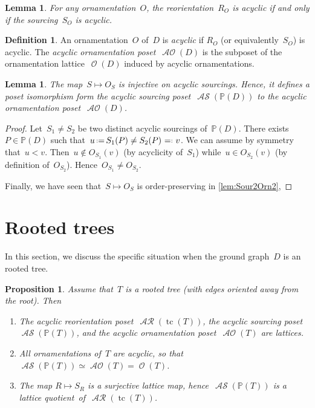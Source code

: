 \documentclass{amsart}
\newtheorem{proposition}[theorem]{Proposition}
\newtheorem{lemma}[theorem]{Lemma}
\theoremstyle{definition}
\newtheorem{definition}[theorem]{Definition}
\renewcommand{\c}[1]{\mathcal{#1}} %
\newcommand{\eqdef}{\mbox{\,\raisebox{0.2ex}{\scriptsize\ensuremath{\mathrm:}}\ensuremath{=}\,}} %
\newcommand{\defeq}{\mbox{~\ensuremath{=}\raisebox{0.2ex}{\scriptsize\ensuremath{\mathrm:}} }} %
\DeclareMathOperator{\tc}{tc} %
\newcommand{\darkblue}{\color{darkblue}} %
\newcommand{\defn}[1]{\textsl{\darkblue #1}} %
\DeclareMathOperator{\Orn}{\c{O}}  %
\DeclareMathOperator{\AOrn}{\c{AO}}  %
\DeclareMathOperator{\AReori}{\c{AR}}  %
\DeclareMathOperator{\ASour}{\mathcal{AS}}  %
\newcommand{\PP}{\mathbb P} %
\begin{document}
\begin{lemma}
For any ornamentation~$O$, the reorientation~$R_O$ is acyclic if and only if the sourcing~$S_O$ is acyclic.
\end{lemma}

\begin{definition}
An ornamentation~$O$ of~$D$ is \defn{acyclic} if $R_O$ (or equivalently~$S_O$) is acyclic.
The \defn{acyclic ornamentation poset}~$\AOrn(D)$ is the subposet of the ornamentation lattice~$\Orn(D)$ induced by acyclic ornamentations.
\end{definition}

\begin{lemma}
The map~$S \mapsto O_{\!S}$ is injective on acyclic sourcings.
Hence, it defines a poset isomorphism form the acyclic sourcing poset~$\ASour(\PP(D))$ to the acyclic ornamentation poset~$\AOrn(D)$.
\end{lemma}

\begin{proof}
Let~$S_1 \ne S_2$ be two distinct acyclic sourcings of~$\PP(D)$.
There exists~$P \in \PP(D)$ such that~$u \eqdef S_1(P) \ne S_2(P) \defeq v$.
We can assume by symmetry that~$u < v$.
Then~$u \notin O_{\!S_1}(v)$ (by acyclicity of~$S_1$) while~$u \in O_{\!S_2}(v)$ (by definition of~$O_{\!S_2}$).
Hence~$O_{\!S_1} \ne O_{\!S_2}$.

Finally, we have seen that~$S \mapsto O_{\!S}$ is order-preserving in \cref{lem:Sour2Orn2}, 
\end{proof}


\section{Rooted trees}

In this section, we discuss the specific situation when the ground graph~$D$ is an rooted tree.

\begin{proposition}
Assume that~$T$ is a rooted tree (with edges oriented away from the root). Then
\begin{enumerate}
\item The acyclic reorientation poset~$\AReori(\tc(T))$, the acyclic sourcing poset~$\ASour(\PP(T))$, and the acyclic ornamentation poset~$\AOrn(T)$ are lattices.
\item All ornamentations of~$T$ are acyclic, so that~$\ASour(\PP(T)) \simeq \AOrn(T) = \Orn(T)$.
\item The map $R \mapsto S_{\!R}$ is a surjective lattice map, hence~$\ASour(\PP(T))$ is a lattice quotient~of~$\AReori(\tc(T))$.
\end{enumerate}
\end{proposition}
\end{document}
